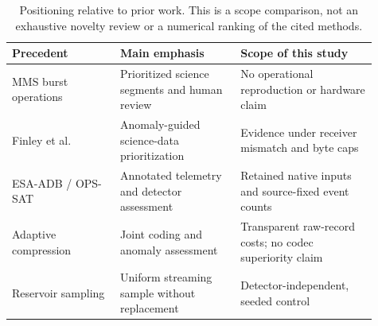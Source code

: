 \begin{table}[htbp]
\centering
\small
\begin{tabular}{>{\raggedright\arraybackslash}p{0.27\linewidth}>{\raggedright\arraybackslash}p{0.30\linewidth}>{\raggedright\arraybackslash}p{0.34\linewidth}}
\toprule
Precedent & Main emphasis & Scope of this study \\
\midrule
MMS burst operations & Prioritized science segments and human review & No operational reproduction or hardware claim \\
Finley et al. & Anomaly-guided science-data prioritization & Evidence under receiver mismatch and byte caps \\
ESA-ADB / OPS-SAT & Annotated telemetry and detector assessment & Retained native inputs and source-fixed event counts \\
Adaptive compression & Joint coding and anomaly assessment & Transparent raw-record costs; no codec superiority claim \\
Reservoir sampling & Uniform streaming sample without replacement & Detector-independent, seeded control \\
\bottomrule
\end{tabular}
\caption{Positioning relative to prior work. This is a scope comparison, not an
exhaustive novelty review or a numerical ranking of the cited methods.}
\label{tab:positioning}
\end{table}
